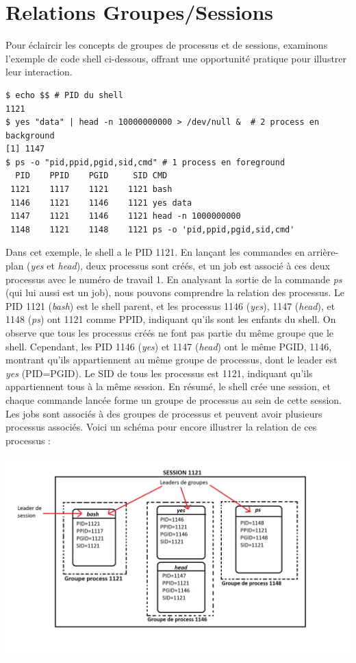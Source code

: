 \section{Relations Groupes/Sessions}

Pour éclaircir les concepts de groupes de processus et de sessions, examinons l'exemple de code shell ci-dessous, offrant une opportunité pratique pour illustrer leur interaction.

\begin{lstlisting}[style=blackstyle]
$ echo $$ # PID du shell
1121
$ yes "data" | head -n 10000000000 > /dev/null &  # 2 process en background
[1] 1147
$ ps -o "pid,ppid,pgid,sid,cmd" # 1 process en foreground
  PID    PPID    PGID     SID CMD
 1121    1117    1121    1121 bash
 1146    1121    1146    1121 yes data
 1147    1121    1146    1121 head -n 1000000000
 1148    1121    1148    1121 ps -o 'pid,ppid,pgid,sid,cmd'
\end{lstlisting}

Dans cet exemple, le shell a le PID 1121. En lançant les commandes en arrière-plan (\textit{yes} et \textit{head}), deux processus sont créés, et un job est associé à ces deux processus avec le numéro de travail 1. 
En analysant la sortie de la commande \textit{ps} (qui lui aussi est un job), nous pouvons comprendre la relation des processus.
\newline
Le PID 1121 (\textit{bash}) est le shell parent, et les processus 1146 (\textit{yes}), 1147 (\textit{head}), et 1148 (\textit{ps}) ont 1121 comme PPID, indiquant qu'ils sont les enfants du shell. 
On observe que tous les processus créés ne font pas partie du même groupe que le shell. Cependant, les PID 1146 (\textit{yes}) et 1147 (\textit{head}) ont le même PGID, 1146, montrant qu'ils appartiennent au 
même groupe de processus, dont le leader est \textit{yes} (PID=PGID). Le SID de tous les processus est 1121, indiquant qu'ils appartiennent tous à la même session.
\newline
En résumé, le shell crée une session, et chaque commande lancée forme un groupe de processus au sein de cette session. Les jobs sont associés à des groupes de processus et peuvent avoir 
plusieurs processus associés.
\newline
\newline
\newline
Voici un schéma pour encore illustrer la relation de ces processus : 

\includegraphics[width=1\textwidth]{img/relationshipSchema.png}
